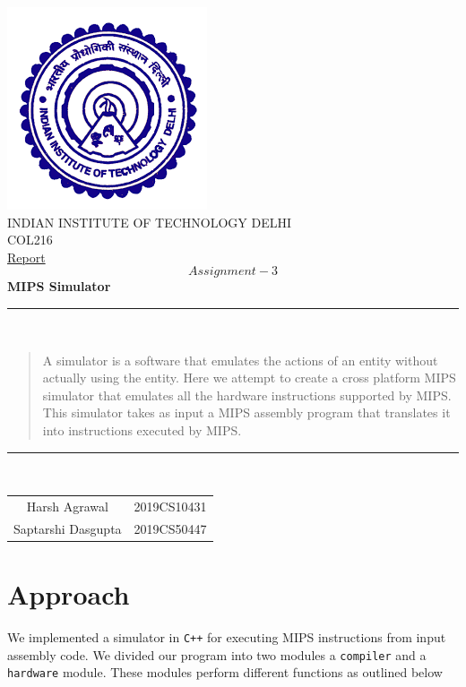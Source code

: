 \documentclass[hidelinks,12pt]{article}
\begin{document}
\begin{titlepage}
    \centering
    \includegraphics[scale=0.5]{../../logo.png}\\[1.0cm]
    \Large INDIAN INSTITUTE OF TECHNOLOGY DELHI\\[1.0 cm]
    \LARGE COL216\\[0.1cm]
    \Large \underline{Report}\\
    \large \[Assignment-3\]
    \LARGE \textbf{MIPS Simulator}


    \rule{\textwidth}{0.2 mm} \\[0.1cm]
    \begin{abstract}
        A simulator is a software that emulates the actions of an entity without actually using the entity.
        Here we attempt to create a cross platform MIPS simulator that emulates all the hardware instructions supported by MIPS.
        This simulator takes as input a MIPS assembly program that translates it into instructions executed by MIPS.
        \\[0.1cm]
    \end{abstract}
    \rule{\textwidth}{0.2 mm} \\[0.1cm]
    \begin{flushright}

        \begin{tabular}{c c}
            \small {Harsh Agrawal}      & \small {2019CS10431} \\
            \small {Saptarshi Dasgupta} & \small {2019CS50447} \\
        \end{tabular}
    \end{flushright}
\end{titlepage}
\tableofcontents
\newpage

\section{Approach}
We implemented a simulator in \verb|C++| for executing MIPS instructions from input assembly code. We divided our program into two modules a \verb|compiler| and a \verb|hardware| module.
These modules perform different functions as outlined below
\end{document}
